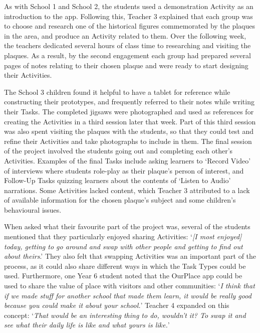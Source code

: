 \documentclass[,hyphens]{sigchi}
\begin{document}
As with School 1 and School 2, the students used a demonstration Activity as an introduction to the app. Following this, Teacher 3 explained that each group was to choose and research one of the historical figures commemorated by the plaques in the area, and produce an Activity related to them. Over the following week, the teachers dedicated several hours of class time to researching and visiting the plaques. As a result, by the second engagement each group had prepared several pages of notes relating to their chosen plaque and were ready to start designing their Activities.

The School 3 children found it helpful to have a tablet for reference while constructing their prototypes, and frequently referred to their notes while writing their Tasks. The completed jigsaws were photographed and used as references for creating the Activities in a third session later that week. Part of this third session was also spent visiting the plaques with the students, so that they could test and refine their Activities and take photographs to include in them. The final session of the project involved the students going out and completing each other's Activities. Examples of the final Tasks include asking learners to `Record Video' of interviews where students role-play as their plaque's person of interest, and Follow-Up Tasks quizzing learners about the contents of `Listen to Audio' narrations. Some Activities lacked content, which Teacher 3 attributed to a lack of available information for the chosen plaque's subject and some children's behavioural issues.

When asked what their favourite part of the project was, several of the students mentioned that they particularly enjoyed sharing Activities: `\textit{[I most enjoyed] today, getting to go around and swap with other people and getting to find out about theirs}.' They also felt that swapping Activities was an important part of the process, as it could also share different ways in which the Task Types could be used. Furthermore, one Year 6 student noted that the OurPlace app could be used to share the value of place with visitors and other communities: `\textit{I think that if we made stuff for another school that made them learn, it would be really good because you could make it about your school.}' Teacher 4 expanded on this concept: `\textit{That would be an interesting thing to do, wouldn't it? To swap it and see what their daily life is like and what yours is like.}' 
\end{document}
